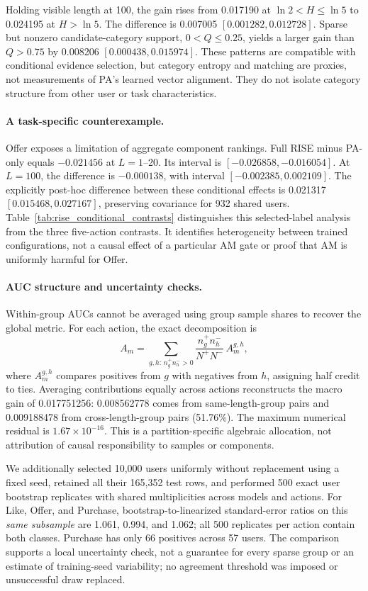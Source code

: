 Holding visible length at 100, the gain rises from 0.017190 at
$\ln2<H\leq\ln5$ to 0.024195 at $H>\ln5$. The difference is 0.007005
$[0.001282,0.012728]$. Sparse but nonzero candidate-category support,
$0<Q\leq0.25$, yields a larger gain than $Q>0.75$ by 0.008206
$[0.000438,0.015974]$. These patterns are compatible with conditional evidence
selection, but category entropy and matching are proxies, not measurements of
PA's learned vector alignment. They do not isolate category structure from
other user or task characteristics.

\paragraph{A task-specific counterexample.}
Offer exposes a limitation of aggregate component rankings. Full RISE minus
PA-only equals $-0.021456$ at $L=1$--20. Its interval is
$[-0.026858,-0.016054]$. At $L=100$, the difference is $-0.000138$,
with interval $[-0.002385,0.002109]$. The explicitly post-hoc difference between these
conditional effects is 0.021317 $[0.015468,0.027167]$, preserving covariance
for 932 shared users. Table~\ref{tab:rise_conditional_contrasts} distinguishes
this selected-label analysis from the three five-action contrasts. It identifies
heterogeneity between trained configurations, not a causal effect of a particular
AM gate or proof that AM is uniformly harmful for Offer.

\paragraph{AUC structure and uncertainty checks.}
Within-group AUCs cannot be averaged using group sample shares to recover the
global metric. For each action, the exact decomposition is
\begin{equation}
 A_m=\sum_{g,h:\,n_g^+n_h^->0}
 \frac{n_g^+n_h^-}{N^+N^-}\,A_m^{g,h},
 \label{eq:rise_auc_pair_decomposition}
\end{equation}
where $A_m^{g,h}$ compares positives from $g$ with negatives from $h$, assigning
half credit to ties. Averaging contributions equally across actions reconstructs
the macro gain of 0.017751256: 0.008562778 comes from same-length-group pairs
and 0.009188478 from cross-length-group pairs (51.76\%). The maximum numerical
residual is $1.67\times10^{-16}$. This is a partition-specific algebraic
allocation, not attribution of causal responsibility to samples or components.

We additionally selected 10,000 users uniformly without replacement using a
fixed seed, retained all their 165,352 test rows, and performed 500 exact user
bootstrap replicates with shared multiplicities across models and actions.
For Like, Offer, and Purchase, bootstrap-to-linearized standard-error ratios
on this \emph{same subsample} are 1.061, 0.994, and 1.062; all 500 replicates
per action contain both classes. Purchase has only 66 positives across 57 users.
The comparison supports a local uncertainty check, not a guarantee for every
sparse group or an estimate of training-seed variability; no agreement threshold
was imposed or unsuccessful draw replaced.

